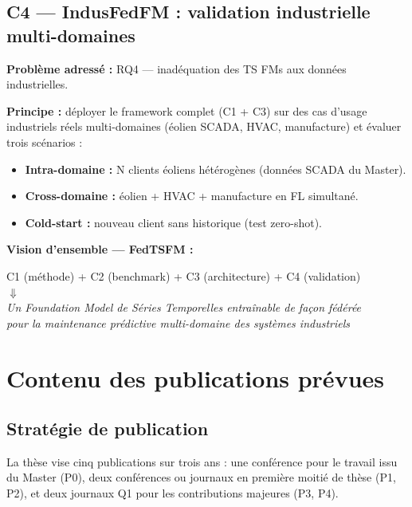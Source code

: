 \documentclass[12pt, a4paper]{report}
\begin{document}
\section{C4 — IndusFedFM : validation industrielle multi-domaines}

\textbf{Problème adressé :} RQ4 — inadéquation des TS FMs aux données industrielles.

\textbf{Principe :} déployer le framework complet (C1 + C3) sur des cas d'usage
industriels réels multi-domaines (éolien SCADA, HVAC, manufacture) et évaluer
trois scénarios :

\begin{itemize}
  \item \textbf{Intra-domaine :} N clients éoliens hétérogènes (données SCADA du Master).
  \item \textbf{Cross-domaine :} éolien + HVAC + manufacture en FL simultané.
  \item \textbf{Cold-start :} nouveau client sans historique (test zero-shot).
\end{itemize}

\begin{infobox}
\textbf{Vision d'ensemble — FedTSFM :}
\begin{center}
C1 (méthode) + C2 (benchmark) + C3 (architecture) + C4 (validation)\\[4pt]
$\Downarrow$\\[4pt]
\textit{Un Foundation Model de Séries Temporelles entraînable de façon fédérée\\
pour la maintenance prédictive multi-domaine des systèmes industriels}
\end{center}
\end{infobox}

\chapter{Contenu des publications prévues}

\section{Stratégie de publication}

La thèse vise cinq publications sur trois ans : une conférence pour le travail issu
du Master (P0), deux conférences ou journaux en première moitié de thèse (P1, P2),
et deux journaux Q1 pour les contributions majeures (P3, P4).
\end{document}
